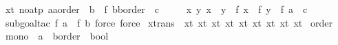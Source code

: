 \begin{isabellebody}
%
\isadelimproof
\isanewline
%
\endisadelimproof
\isanewline
{}\isamarkupfalse%
\ xt{}\ {\isacharbrackleft}{\kern0pt}no{\isacharunderscore}{\kern0pt}atp{\isacharbrackright}{\kern0pt}{\isacharcolon}{\kern0pt}\ {\isachardoublequoteopen}{\isacharparenleft}{\kern0pt}a{\isacharcolon}{\kern0pt}{\isacharcolon}{\kern0pt}{\isacharprime}{\kern0pt}a{\isacharcolon}{\kern0pt}{\isacharcolon}{\kern0pt}order{\isacharparenright}{\kern0pt}\ {\isachargreater}{\kern0pt}\ b\ {\isacharequal}{\kern0pt}{\isacharequal}{\kern0pt}{\isachargreater}{\kern0pt}\ {\isacharparenleft}{\kern0pt}f\ b{\isacharcolon}{\kern0pt}{\isacharcolon}{\kern0pt}{\isacharprime}{\kern0pt}b{\isacharcolon}{\kern0pt}{\isacharcolon}{\kern0pt}order{\isacharparenright}{\kern0pt}\ {\isachargreater}{\kern0pt}\ c\ {\isacharequal}{\kern0pt}{\isacharequal}{\kern0pt}{\isachargreater}{\kern0pt}\isanewline
\ \ \ \ {\isacharparenleft}{\kern0pt}{\isacharbang}{\kern0pt}{\isacharbang}{\kern0pt}x\ y{\isachardot}{\kern0pt}\ x\ {\isachargreater}{\kern0pt}\ y\ {\isacharequal}{\kern0pt}{\isacharequal}{\kern0pt}{\isachargreater}{\kern0pt}\ f\ x\ {\isachargreater}{\kern0pt}\ f\ y{\isacharparenright}{\kern0pt}\ {\isacharequal}{\kern0pt}{\isacharequal}{\kern0pt}{\isachargreater}{\kern0pt}\ f\ a\ {\isachargreater}{\kern0pt}\ c{\isachardoublequoteclose}\isanewline
%
\isadelimproof
%
\endisadelimproof
%
\isatagproof
{}\isamarkupfalse%
\ {\isacharparenleft}{\kern0pt}subgoal{\isacharunderscore}{\kern0pt}tac\ {\isachardoublequoteopen}f\ a\ {\isachargreater}{\kern0pt}\ f\ b{\isachardoublequoteclose}{\isacharcomma}{\kern0pt}\ force{\isacharcomma}{\kern0pt}\ force{\isacharparenright}{\kern0pt}%
\endisatagproof
{\isafoldproof}%
%
\isadelimproof
\isanewline
%
\endisadelimproof
\isanewline
{}\isamarkupfalse%
\ xtrans\ {\isacharequal}{\kern0pt}\ xt{}\ xt{}\ xt{}\ xt{}\ xt{}\ xt{}\ xt{}\ xt{}\ xt{}%
\isadelimdocument
%
\endisadelimdocument
%
\isatagdocument
%
\isamarkuptrue%
%
\endisatagdocument
{\isafolddocument}%
%
\isadelimdocument
%
\endisadelimdocument
{}\isamarkupfalse%
\ order\isanewline
{}\isanewline
\isanewline
{}\isamarkupfalse%
\ mono\ {\isacharcolon}{\kern0pt}{\isacharcolon}{\kern0pt}\ {\isachardoublequoteopen}{\isacharparenleft}{\kern0pt}{\isacharprime}{\kern0pt}a\ {\isasymRightarrow}\ {\isacharprime}{\kern0pt}b{\isacharcolon}{\kern0pt}{\isacharcolon}{\kern0pt}order{\isacharparenright}{\kern0pt}\ {\isasymRightarrow}\ bool{\isachardoublequoteclose}\ \isanewline

\end{isabellebody}
